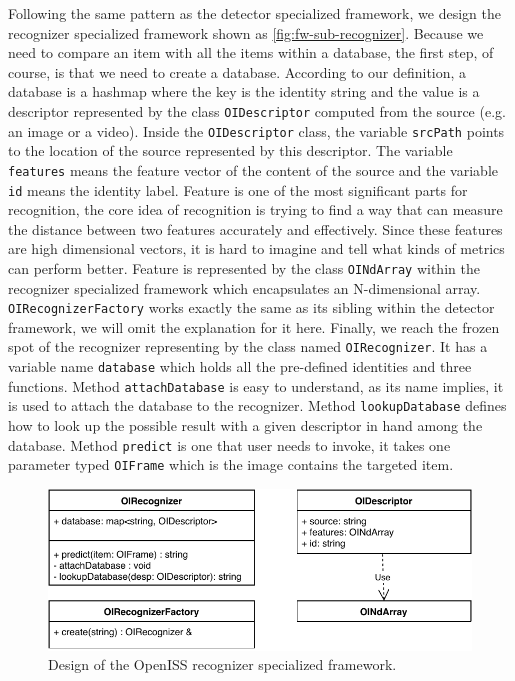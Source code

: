 Following the same pattern as the detector specialized framework, we design the
recognizer specialized framework shown as \autoref{fig:fw-sub-recognizer}.
Because we need to compare an item with all the items within a database, the
first step, of course, is that we need to create a database. According to our
definition, a database is a hashmap where the key is the identity string and
the value is a descriptor represented by the class \texttt{OIDescriptor}
computed from the source (e.g. an image or a video).
Inside the \texttt{OIDescriptor} class, the variable \texttt{srcPath} points to
the location of the source represented by this descriptor. The variable
\texttt{features} means the feature vector of the content of the source and the
variable \texttt{id} means the identity label.
Feature is one of the most significant parts for recognition, the core idea of
recognition is trying to find a way that can measure the distance between two
features accurately and effectively. Since these features are high dimensional
vectors, it is hard to imagine and tell what kinds of metrics can perform
better.
Feature is represented by the class \texttt{OINdArray} within the recognizer
specialized framework which encapsulates an N-dimensional array.
\texttt{OIRecognizerFactory} works exactly the same as its sibling within
the detector framework, we will omit the explanation for it here.
Finally, we reach the frozen spot of the recognizer representing by the class
named \texttt{OIRecognizer}. It has a variable name \texttt{database} which
holds all the pre-defined identities and three functions.
Method \texttt{attachDatabase} is easy to understand, as its name implies, it 
is used to attach the database to the recognizer.
Method \texttt{lookupDatabase} defines how to look up the possible result
with a given descriptor in hand among the database.
Method \texttt{predict} is one that user needs to invoke, it takes one 
parameter typed \texttt{OIFrame} which is the image contains the targeted item.

\begin{figure}
    \centering
    \includegraphics[scale=0.8]{figures/framework_sub_recognizer.pdf}
    \caption{Design of the OpenISS recognizer specialized framework.}
    \label{fig:fw-sub-recognizer}
\end{figure}

